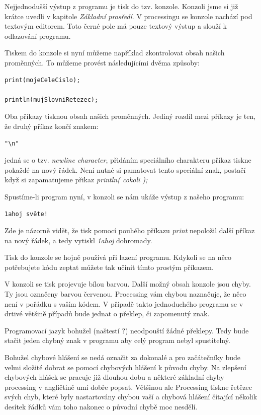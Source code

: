 \documentclass[11pt]{article}
\begin{document}
Nejjednodušší výstup z programu je tisk do tzv. konzole. Konzoli jsme si již krátce uvedli v kapitole {\em Základní prosředí}. V processingu se konzole nachází pod textovým editorem. Toto černé pole má pouze textový výstup a slouží k odlazování programu.

Tiskem do konzole si nyní můžeme například zkontrolovat obsah našich proměnných. To můžeme provést následujícími dvěma způsoby:


\begin{lstlisting}
print(mojeCeleCislo);

println(mujSlovniRetezec);
\end{lstlisting}

Oba příkazy tisknou obsah našich proměnných. Jediný rozdíl mezi příkazy je ten, že druhý příkaz končí znakem:
 
\begin{lstlisting}
"\n"
\end{lstlisting}

jedná se o tzv. {\em newline character}, přidáním speciálního charakteru příkaz tiskne pokaždé na nový řádek. Není nutné si pamatovat tento speciální znak, postačí když si zapamatujeme přikaz {\em println( cokoli );}

Spustíme-li program nyní, v konzoli se nám ukáže výstup z našeho programu:

\begin{lstlisting}
1ahoj světe!
\end{lstlisting}

Zde je názorně vidět, že tisk pomocí pouhého příkazu {\em print} nepoložil další příkaz na nový řádek, a tedy vytiskl {\em 1ahoj} dohromady.

Tisk do konzole se hojně používá při lazení programu. Kdykoli se na něco potřebujete kódu zeptat můžete tak učinit tímto prostým příkazem.

V konzoli se tisk projevuje bílou barvou. Další možný obsah konzole jsou chyby. Ty jsou označeny barvou červenou. Processing vám chybou naznačuje, že něco není v pořádku s vaším kódem. V případě takto jednoduchého programu se v drtivé většině případů bude jednat o překlep, či zapomenutý znak.

Programovací jazyk bohužel (naštestí ?) neodpouští žádné překlepy. Tedy bude stačit jeden chybný znak v programu aby celý program nebyl spustitelný.

Bohužel chybové hlášení se nedá označit za dokonalé a pro začátečníky bude velmi složité dobrat se pomocí chybových hlášení k původu chyby. Na zlepšení chybových hlášek se pracuje již dlouhou dobu a některé základní chyby processing v angličtině umí dobře popsat. Většinou ale Processing tiskne řetězec svých chyb, které byly nastartovány chybou vaší a chybová hlášení čítající několik desítek řádků vám toho nakonec o původní chybě moc nesdělí.
\end{document}
